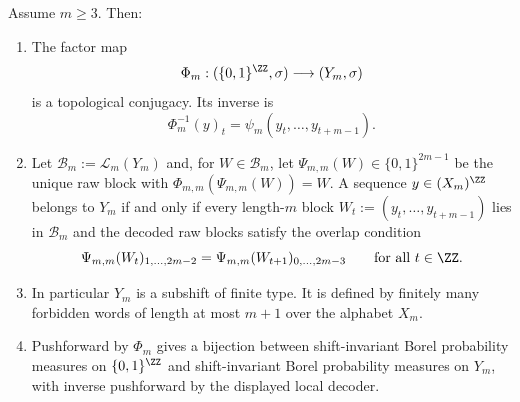 \begin{theorem}\label{thm:two-sided-conjugacy}
Assume $m\ge3$.  Then:
\begin{enumerate}[label=(\roman*),leftmargin=*,itemsep=2pt]
  \item The factor map
  \[
  \Phi_m:(\{0,1\}^{\ZZ},\sigma)\longrightarrow(Y_m,\sigma)
  \]
  is a topological conjugacy.  Its inverse is
  \[
  \Phi_m^{-1}(y)_t=\psi_m(y_t,\ldots,y_{t+m-1}).
  \]
  \item Let $\mathcal B_m:=\mathcal L_m(Y_m)$ and, for
  $W\in\mathcal B_m$, let $\Psi_{m,m}(W)\in\{0,1\}^{2m-1}$ be the unique
  raw block with $\Phi_{m,m}(\Psi_{m,m}(W))=W$.  A sequence
  $y\in(X_m)^{\ZZ}$ belongs to $Y_m$ if and only if every length-$m$ block
  $W_t:=(y_t,\ldots,y_{t+m-1})$ lies in $\mathcal B_m$ and the decoded raw
  blocks satisfy the overlap condition
  \[
  \Psi_{m,m}(W_t)_{1,\ldots,2m-2}
  =
  \Psi_{m,m}(W_{t+1})_{0,\ldots,2m-3}
  \qquad\text{for all }t\in\ZZ.
  \]
  \item In particular $Y_m$ is a subshift of finite type.  It is defined by
  finitely many forbidden words of length at most $m+1$ over the alphabet
  $X_m$.
  \item Pushforward by $\Phi_m$ gives a bijection between shift-invariant
  Borel probability measures on $\{0,1\}^{\ZZ}$ and shift-invariant Borel
  probability measures on $Y_m$, with inverse pushforward by the displayed
  local decoder.
\end{enumerate}
\end{theorem}

